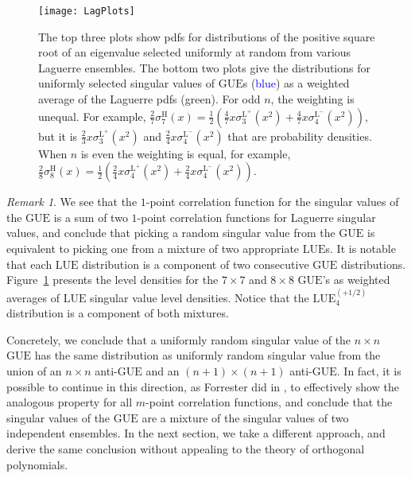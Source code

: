 \documentclass[pdftex, oneside, 10pt, letterpaper]{amsart}
\theoremstyle{plain}
\theoremstyle{definition}
\theoremstyle{remark}
\newtheorem*{rem}{Remark}
\begin{document}
\begin{figure}
\texttt{[image: LagPlots]}
\caption{The top three plots show pdfs for distributions of the
  positive square root of an eigenvalue selected uniformly at random
  from various Laguerre ensembles.  The bottom two plots give the
  distributions for uniformly selected singular values of {\ensuremath{\mathrm{GUE}}}{}s
  (\textcolor{blue}{blue}) as a weighted average of the Laguerre
  pdfs (\textcolor{OliveGreen}{green}).  For odd $n$, the weighting is
  unequal.  For example,
  $\frac27\sigma_7^\mathrm{H}(x)=\frac{1}{2}\left(
  \frac{4}{7}x\sigma_3^{\mathrm{L}^+}(x^2)+\frac{4}{7}x\sigma_4^{\mathrm{L}^-}(x^2)
  \right)$, but it is $\frac{2}{3}x\sigma_3^{\mathrm{L}^+}(x^2)$ and
  $\frac{2}{4}x\sigma_4^{\mathrm{L}^-}(x^2)$ that are probability
  densities.  When $n$ is even the weighting is equal, for example,
  $\frac28\sigma_8^\mathrm{H}(x)=\frac{1}{2}\left(
  \frac{2}{4}x\sigma_4^{\mathrm{L}^+}(x^2)+\frac{2}{4}x\sigma_4^{\mathrm{L}^-}(x^2)
  \right)$.}\label{fig:LagPlots}
\end{figure}

\begin{rem}
We see that the $1$-point correlation function for the singular
values of the {\ensuremath{\mathrm{GUE}}}{} is a sum of two $1$-point correlation functions
for Laguerre singular values, and conclude that picking a random
singular value from the {\ensuremath{\mathrm{GUE}}}{} is equivalent to picking one from a
mixture of two appropriate {\ensuremath{\mathrm{LUE}}}{}s.  It is notable that each
{\ensuremath{\mathrm{LUE}}}{} distribution is a component of two consecutive {\ensuremath{\mathrm{GUE}}}{}
distributions.  Figure~\ref{fig:LagPlots} presents the level densities
for the $7\times7$ and $8\times8$ {\ensuremath{\mathrm{GUE}}}{}'s as weighted averages of
{\ensuremath{\mathrm{LUE}}}{} singular value level densities.  Notice that the
${\ensuremath{\mathrm{LUE}}}_4^{(+1/2)}$ distribution is a component of both mixtures.
\end{rem}

Concretely, we conclude that a uniformly random singular value of the
$n\times{}n$ {\ensuremath{\mathrm{GUE}}}{} has the same distribution as uniformly random
singular value from the union of an $n\times{}n$ anti-{\ensuremath{\mathrm{GUE}}}{} and an
$(n+1)\times(n+1)$ anti-{\ensuremath{\mathrm{GUE}}}{}.  In fact, it is possible to continue
in this direction, as Forrester did in \cite{Forrester-Evenness}, to
effectively show the analogous property for all $m$-point correlation
functions, and conclude that the singular values of the {\ensuremath{\mathrm{GUE}}}{} are a
mixture of the singular values of two independent ensembles.  In the
next section, we take a different approach, and derive the same
conclusion without appealing to the theory of orthogonal polynomials.
\end{document}
